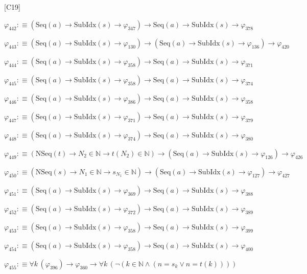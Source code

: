 \begin{fullproof}{[C19]}
\begin{abbrevlist}
\item $\varphi_{442} :\equiv (\mathrm{Seq}(a) \to \mathrm{SubIdx}(s) \to \varphi_{347}) \to \mathrm{Seq}(a) \to \mathrm{SubIdx}(s) \to \varphi_{378}$
\item $\varphi_{443} :\equiv (\mathrm{Seq}(a) \to \mathrm{SubIdx}(s) \to \varphi_{130}) \to (\mathrm{Seq}(a) \to \mathrm{SubIdx}(s) \to \varphi_{136}) \to \varphi_{420}$
\item $\varphi_{444} :\equiv (\mathrm{Seq}(a) \to \mathrm{SubIdx}(s) \to \varphi_{358}) \to \mathrm{Seq}(a) \to \mathrm{SubIdx}(s) \to \varphi_{371}$
\item $\varphi_{445} :\equiv (\mathrm{Seq}(a) \to \mathrm{SubIdx}(s) \to \varphi_{358}) \to \mathrm{Seq}(a) \to \mathrm{SubIdx}(s) \to \varphi_{374}$
\item $\varphi_{446} :\equiv (\mathrm{Seq}(a) \to \mathrm{SubIdx}(s) \to \varphi_{386}) \to \mathrm{Seq}(a) \to \mathrm{SubIdx}(s) \to \varphi_{358}$
\item $\varphi_{447} :\equiv (\mathrm{Seq}(a) \to \mathrm{SubIdx}(s) \to \varphi_{371}) \to \mathrm{Seq}(a) \to \mathrm{SubIdx}(s) \to \varphi_{379}$
\item $\varphi_{448} :\equiv (\mathrm{Seq}(a) \to \mathrm{SubIdx}(s) \to \varphi_{374}) \to \mathrm{Seq}(a) \to \mathrm{SubIdx}(s) \to \varphi_{380}$
\item $\varphi_{449} :\equiv (\mathrm{NSeq}(t) \to N_{2} \in \mathbb{N} \to t(N_{2}) \in \mathbb{N}) \to (\mathrm{Seq}(a) \to \mathrm{SubIdx}(s) \to \varphi_{126}) \to \varphi_{426}$
\item $\varphi_{450} :\equiv (\mathrm{NSeq}(s) \to N_{1} \in \mathbb{N} \to s_{N_{1}} \in \mathbb{N}) \to (\mathrm{Seq}(a) \to \mathrm{SubIdx}(s) \to \varphi_{127}) \to \varphi_{427}$
\item $\varphi_{451} :\equiv (\mathrm{Seq}(a) \to \mathrm{SubIdx}(s) \to \varphi_{369}) \to \mathrm{Seq}(a) \to \mathrm{SubIdx}(s) \to \varphi_{388}$
\item $\varphi_{452} :\equiv (\mathrm{Seq}(a) \to \mathrm{SubIdx}(s) \to \varphi_{372}) \to \mathrm{Seq}(a) \to \mathrm{SubIdx}(s) \to \varphi_{389}$
\item $\varphi_{453} :\equiv (\mathrm{Seq}(a) \to \mathrm{SubIdx}(s) \to \varphi_{358}) \to \mathrm{Seq}(a) \to \mathrm{SubIdx}(s) \to \varphi_{399}$
\item $\varphi_{454} :\equiv (\mathrm{Seq}(a) \to \mathrm{SubIdx}(s) \to \varphi_{358}) \to \mathrm{Seq}(a) \to \mathrm{SubIdx}(s) \to \varphi_{400}$
\item $\varphi_{455} :\equiv \forall k\,(\varphi_{396}) \to \varphi_{360} \to \forall k\,(\neg (k \in \mathbb{N} \land (n = s_{k} \lor n = t(k))))$

\end{abbrevlist}
\end{fullproof}

